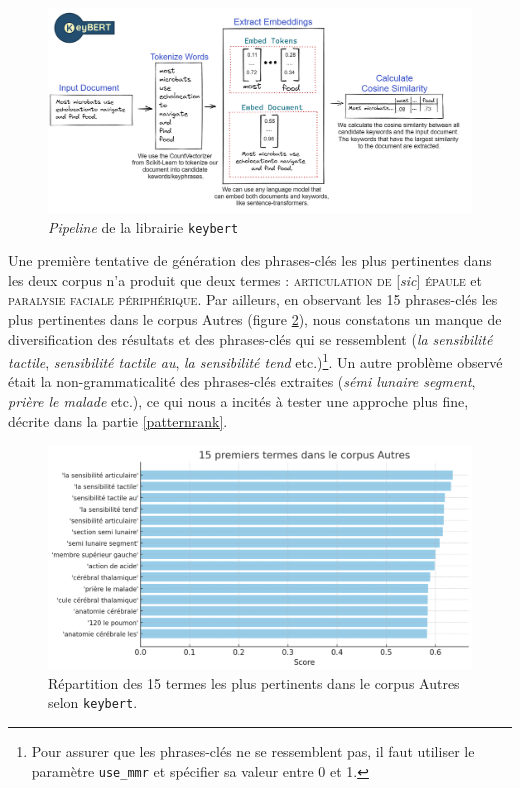 \begin{figure}[!h]
    \centering
    \includegraphics[width=1\textwidth]{img/keybert.png}
    \caption[\textit{Pipeline} de la librairie \texttt{keybert}.]{\textit{Pipeline} de la librairie \texttt{keybert}\protect{}}
    \label{fig:keybert}
\end{figure}


Une première tentative de génération des phrases-clés les plus pertinentes dans les deux corpus n'a produit que deux termes : \textsc{articulation de} [\textit{sic}] \textsc{épaule} et \textsc{paralysie faciale périphérique}. Par ailleurs, en observant les 15 phrases-clés les plus pertinentes dans le corpus \og Autres \fg{} (figure \ref{fig:keybert_autres}), nous constatons un manque de diversification des résultats et des phrases-clés qui se ressemblent (\textit{la sensibilité tactile}, \textit{sensibilité tactile au}, \textit{la sensibilité tend} etc.)\footnote{Pour assurer que les phrases-clés ne se ressemblent pas, il faut utiliser le paramètre \texttt{use\_mmr} et spécifier sa valeur entre 0 et 1.}. Un autre problème observé était la non-grammaticalité des phrases-clés extraites (\textit{sémi lunaire segment}, \textit{prière le malade} etc.), ce qui nous a incités à tester une approche plus fine, décrite dans la partie \ref{patternrank}.

\begin{figure}[!h]
    \centering
    \includegraphics[width=1\textwidth]{img/keybert_autres.png}
    \caption{Répartition des 15 termes les plus pertinents dans le corpus \og{}Autres\fg{} selon \texttt{keybert}.}
    \label{fig:keybert_autres}
\end{figure}


